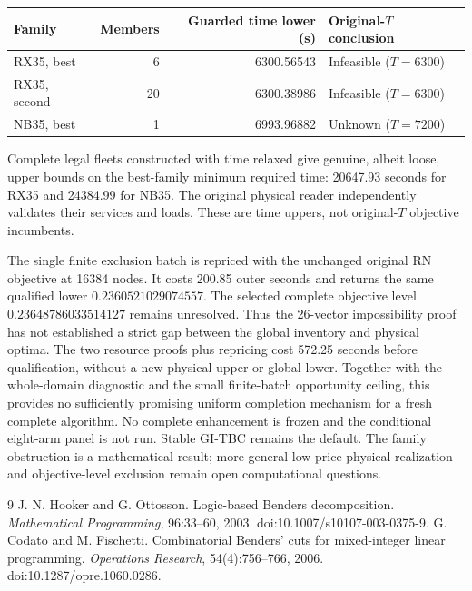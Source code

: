 \documentclass[11pt]{article}
\begin{document}
\begin{center}
\begin{tabular}{lrrl}
\toprule
Family & Members & Guarded time lower (s) & Original-$T$ conclusion\\
\midrule
RX35, best & 6 & 6300.56543 & Infeasible ($T=6300$)\\
RX35, second & 20 & 6300.38986 & Infeasible ($T=6300$)\\
NB35, best & 1 & 6993.96882 & Unknown ($T=7200$)\\
\bottomrule
\end{tabular}
\end{center}
Complete legal fleets constructed with time relaxed give genuine, albeit
loose, upper bounds on the best-family minimum required time: 20647.93
seconds for RX35 and 24384.99 for NB35. The original physical reader
independently validates their services and loads. These are time uppers,
not original-$T$ objective incumbents.

The single finite exclusion batch is repriced with the unchanged original
RN objective at 16384 nodes. It costs 200.85 outer seconds and returns
the same qualified lower $0.2360521029074557$. The selected complete
objective level $0.23648786033514127$ remains unresolved. Thus the
26-vector impossibility proof has not established a strict gap between
the global inventory and physical optima. The two resource proofs plus
repricing cost 572.25 seconds before qualification, without a new physical
upper or global lower. Together with the whole-domain diagnostic and the
small finite-batch opportunity ceiling, this provides no sufficiently
promising uniform completion mechanism for a fresh complete algorithm.
No complete enhancement is frozen and the conditional eight-arm panel
is not run. Stable GI-TBC remains the default. The family obstruction is
a mathematical result; more general low-price physical realization and
objective-level exclusion remain open computational questions.

\begin{thebibliography}{9}
 J. N. Hooker and G. Ottosson.
Logic-based Benders decomposition. \emph{Mathematical Programming},
96:33--60, 2003. doi:10.1007/s10107-003-0375-9.
 G. Codato and M. Fischetti.
Combinatorial Benders' cuts for mixed-integer linear programming.
\emph{Operations Research}, 54(4):756--766, 2006.
doi:10.1287/opre.1060.0286.
\end{thebibliography}
\end{document}
